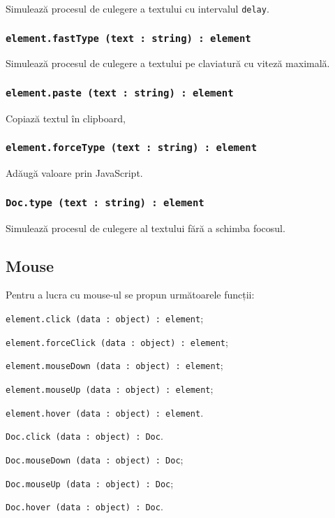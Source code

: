 Simulează procesul de culegere a textului cu intervalul \texttt{delay}.

\subsubsection{\texttt{element.fastType (text : string) : element}}

Simulează procesul de culegere a textului pe claviatură cu viteză maximală.

\subsubsection{\texttt{element.paste (text : string) : element}}

Copiază textul în clipboard, 

\subsubsection{\texttt{element.forceType (text : string) : element}}

Adăugă valoare prin JavaScript.

\subsubsection{\texttt{Doc.type (text : string) : element}}

Simulează procesul de culegere al textului fără a schimba focosul.

\subsection{Mouse}
\label{mouse}

Pentru a lucra cu mouse-ul se propun următoarele funcții:
\begin{icItems}
	\item \texttt{element.click (data : object) : element};
	\item \texttt{element.forceClick (data : object) : element};
	\item \texttt{element.mouseDown (data : object) : element};
	\item \texttt{element.mouseUp (data : object) : element};
	\item \texttt{element.hover (data : object) : element}.
	\item \texttt{Doc.click (data : object) : Doc}.
	\item \texttt{Doc.mouseDown (data : object) : Doc};
	\item \texttt{Doc.mouseUp (data : object) : Doc};
	\item \texttt{Doc.hover (data : object) : Doc}.
\end{icItems}


